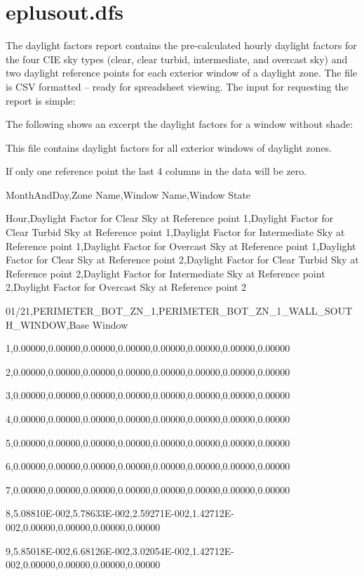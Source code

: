 \section{eplusout.dfs}\label{eplusout.dfs}

The daylight factors report contains the pre-calculated hourly daylight factors for the four CIE sky types (clear, clear turbid, intermediate, and overcast sky) and two daylight reference points for each exterior window of a daylight zone. The file is CSV formatted -- ready for spreadsheet viewing. The input for requesting the report is simple:

The following shows an excerpt the daylight factors for a window without shade:

This file contains daylight factors for all exterior windows of daylight zones.

If only one reference point the last 4 columns in the data will be zero.

MonthAndDay,Zone Name,Window Name,Window State

Hour,Daylight Factor for Clear Sky at Reference point 1,Daylight Factor for Clear Turbid Sky at Reference point 1,Daylight Factor for Intermediate Sky at Reference point 1,Daylight Factor for Overcast Sky at Reference point 1,Daylight Factor for Clear Sky at Reference point 2,Daylight Factor for Clear Turbid Sky at Reference point 2,Daylight Factor for Intermediate Sky at Reference point 2,Daylight Factor for Overcast Sky at Reference point 2

01/21,PERIMETER\_BOT\_ZN\_1,PERIMETER\_BOT\_ZN\_1\_WALL\_SOUTH\_WINDOW,Base Window

1,0.00000,0.00000,0.00000,0.00000,0.00000,0.00000,0.00000,0.00000

2,0.00000,0.00000,0.00000,0.00000,0.00000,0.00000,0.00000,0.00000

3,0.00000,0.00000,0.00000,0.00000,0.00000,0.00000,0.00000,0.00000

4,0.00000,0.00000,0.00000,0.00000,0.00000,0.00000,0.00000,0.00000

5,0.00000,0.00000,0.00000,0.00000,0.00000,0.00000,0.00000,0.00000

6,0.00000,0.00000,0.00000,0.00000,0.00000,0.00000,0.00000,0.00000

7,0.00000,0.00000,0.00000,0.00000,0.00000,0.00000,0.00000,0.00000

8,5.08810E-002,5.78633E-002,2.59271E-002,1.42712E-002,0.00000,0.00000,0.00000,0.00000

9,5.85018E-002,6.68126E-002,3.02054E-002,1.42712E-002,0.00000,0.00000,0.00000,0.00000

